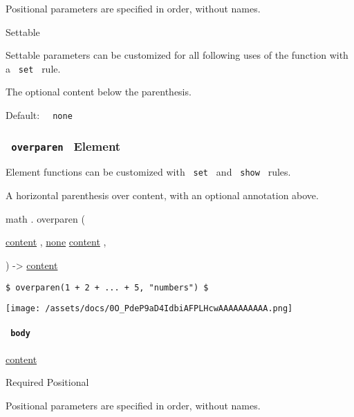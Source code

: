 \label{functions-underparen-annotation-positional-tooltip}
Positional parameters are specified in order, without names.

{{ Settable }}

\label{functions-underparen-annotation-settable-tooltip}
Settable parameters can be customized for all following uses of the
function with a \texttt{\ set\ } rule.

The optional content below the parenthesis.

Default: \texttt{\ }{\texttt{\ none\ }}\texttt{\ }

\subsubsection{\texorpdfstring{\texttt{\ overparen\ } {{ Element
}}}{ overparen   Element }}\label{functions-overparen}

\label{functions-overparen-element-tooltip}
Element functions can be customized with \texttt{\ set\ } and
\texttt{\ show\ } rules.

A horizontal parenthesis over content, with an optional annotation
above.

math { . } { overparen } (

{ \href{/docs/reference/foundations/content/}{content} , } {
\hyperref[functions-overparen-parameters-annotation]{}
\href{/docs/reference/foundations/none/}{none}
\href{/docs/reference/foundations/content/}{content} , }

) -\textgreater{} \href{/docs/reference/foundations/content/}{content}

\begin{verbatim}
$ overparen(1 + 2 + ... + 5, "numbers") $
\end{verbatim}

\texttt{[image: /assets/docs/0O\_PdeP9aD4IdbiAFPLHcwAAAAAAAAAA.png]}

\paragraph{\texorpdfstring{\texttt{\ body\ }}{ body }}\label{functions-overparen-body}

\href{/docs/reference/foundations/content/}{content}

{Required} {{ Positional }}

\label{functions-overparen-body-positional-tooltip}
Positional parameters are specified in order, without names.

